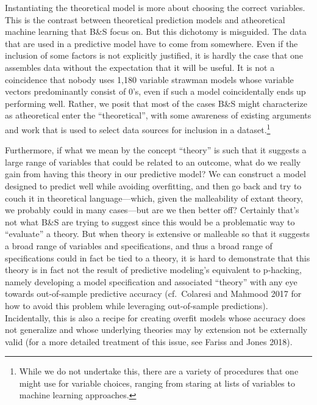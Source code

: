 \documentclass[
]{article}
\begin{document}
Instantiating the theoretical model is more about choosing the correct variables. This is the contrast between theoretical prediction models and atheoretical machine learning that B\&S focus on. But this dichotomy is misguided. The data that are used in a predictive model have to come from somewhere. Even if the inclusion of some factors is not explicitly justified, it is hardly the case that one assembles data without the expectation that it will be useful. It is not a coincidence that nobody uses 1,180 variable strawman models whose variable vectors predominantly consist of 0's, even if such a model coincidentally ends up performing well. Rather, we posit that most of the cases B\&S might characterize as atheoretical enter the ``theoretical'', with some awareness of existing arguments and work that is used to select data sources for inclusion in a dataset.\footnote{While we do not undertake this, there are a variety of procedures that one might use for variable choices, ranging from staring at lists of variables to machine learning approaches.}

Furthermore, if what we mean by the concept ``theory'' is such that it suggests a large range of variables that could be related to an outcome, what do we really gain from having this theory in our predictive model? We can construct a model designed to predict well while avoiding overfitting, and then go back and try to couch it in theoretical language---which, given the malleability of extant theory, we probably could in many cases---but are we then better off? Certainly that's not what B\&S are trying to suggest since this would be a problematic way to ``evaluate'' a theory. But when theory is extensive or malleable so that it suggests a broad range of variables and specifications, and thus a broad range of specifications could in fact be tied to a theory, it is hard to demonstrate that this theory is in fact not the result of predictive modeling's equivalent to p-hacking, namely developing a model specification and associated ``theory'' with any eye towards out-of-sample predictive accuracy (cf.~Colaresi and Mahmood 2017 for how to avoid this problem while leveraging out-of-sample predictions). Incidentally, this is also a recipe for creating overfit models whose accuracy does not generalize and whose underlying theories may by extension not be externally valid (for a more detailed treatment of this issue, see Fariss and Jones 2018).
\end{document}
